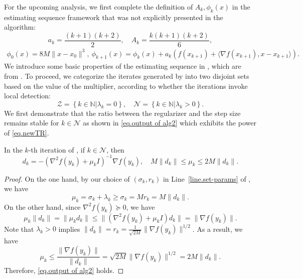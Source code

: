 \documentclass{article}
\begin{document}
For the upcoming analysis, we first complete the definition of $A_k,\phi_k(x)$ in the estimating sequence framework that was not explicitly presented in the algorithm:
\begin{equation}
    \label{eq.update a and A}
    a_k = \frac{(k+1)(k+2)}{2}, \quad A_k=\frac{k(k+1)(k+2)}{6},
\end{equation}
\begin{align}\label{eq.update phi}
    \phi_0(x) = 8M\|x-x_0\|^3, \ \phi_{k+1}(x) =\phi_k(x)+a_k\left (f(x_{k+1})+\langle \nabla f(x_{k+1}),x-x_{k+1}\rangle \right ).
\end{align}
We introduce some basic properties of the estimating sequence in , which are from \citet{nesterov2018lectures}. To proceed, we categorize the iterates generated by  into two disjoint sets based on the value of the multiplier, according to whether the iterations invoke local detection:
\begin{equation}
    \label{eq.outer index catagory}
    \mathcal{Z} = \left \{k\in \mathbb{N} | \lambda_k=0\right\}, \quad \mathcal{N} = \left \{ k\in\mathbb{N} |  \lambda_k>0\right\}.
\end{equation}
We first demonstrate that the ratio between the regularizer and the step size remains stable for $k\in\mathcal{N}$ as shown in \eqref{eq.output of alg2} which exhibits the power of \ref{eq.newTR}.
\begin{lemma}
    \label{lem.ratio pass nonzero}
    In the $k$-th iteration of , if $k\in\mathcal{N}$, then
    \begin{equation}
        \label{eq.output of alg2}
        d_k = -(\nabla^2 f(y_k)+\mu_k I )^{-1}\nabla f(y_k), \quad
        M\|d_k\|\leq \mu_k \leq 2M\|d_k\|.
    \end{equation}
\end{lemma}
\begin{proof}
    On the one hand, by our choice of $(\sigma_k,r_k)$ in Line~\ref{line.set-params} of , we have $$\mu_k=\sigma_k+\lambda_k\geq\sigma_k= Mr_k= M\|d_k\|.$$
    On the other hand, since $\nabla^2 f(y_k)\succeq 0$, we have
    \begin{equation*}
        \mu_k\|d_k\|=\|\mu_kd_k\|\leq \|(\nabla^2 f(y_k)+\mu_k I)d_k\|=\|\nabla f(y_k)\|.
    \end{equation*}
    Note that $\lambda_k>0$ implies $\|d_k\|=r_k=\frac{1}{\sqrt{2M}}\|\nabla f(y_k)\|^{1/2}$. As a result, we have
    \begin{equation*}
        \mu_k\leq \frac{\|\nabla f(y_k)\|}{\|d_k\|}=\sqrt{2M}\|\nabla f(y_k)\|^{1/2}=2M\|d_k\|.
    \end{equation*}
    Therefore, \eqref{eq.output of alg2} holds.
\end{proof}
\end{document}
